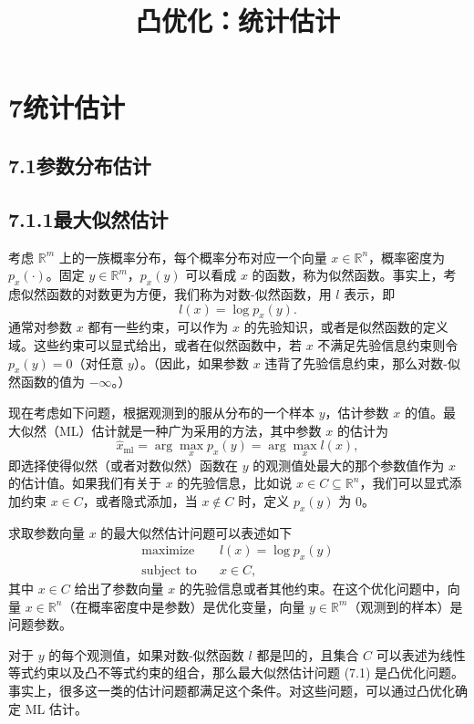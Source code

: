 \documentclass[UTF8, 12pt, fontset=fandol, oneside]{ctexart}
\title{凸优化：统计估计}
\author{}
\date{}
\begin{document}
\maketitle

\section*{7\quad 统计估计}

\subsection*{7.1\quad 参数分布估计}

\subsection*{7.1.1\quad 最大似然估计}

考虑 $\mathbb{R}^m$ 上的一族概率分布，每个概率分布对应一个向量 $x\in\mathbb{R}^n$，概率密度为 $p_x(\cdot)$。固定 $y\in\mathbb{R}^m$，$p_x(y)$ 可以看成 $x$ 的函数，称为似然函数。事实上，考虑似然函数的对数更为方便，我们称为对数-似然函数，用 $l$ 表示，即
\[
l(x)=\log p_x(y).
\]
通常对参数 $x$ 都有一些约束，可以作为 $x$ 的先验知识，或者是似然函数的定义域。这些约束可以显式给出，或者在似然函数中，若 $x$ 不满足先验信息约束则令 $p_x(y)=0$（对任意 $y$）。（因此，如果参数 $x$ 违背了先验信息约束，那么对数-似然函数的值为 $-\infty$。）

现在考虑如下问题，根据观测到的服从分布的一个样本 $y$，估计参数 $x$ 的值。最大似然（ML）估计就是一种广为采用的方法，其中参数 $x$ 的估计为
\[
\hat{x}_{\mathrm{ml}}=\arg\max_x p_x(y)=\arg\max_x l(x),
\]
即选择使得似然（或者对数似然）函数在 $y$ 的观测值处最大的那个参数值作为 $x$ 的估计值。如果我们有关于 $x$ 的先验信息，比如说 $x\in C\subseteq\mathbb{R}^n$，我们可以显式添加约束 $x\in C$，或者隐式添加，当 $x\notin C$ 时，定义 $p_x(y)$ 为 $0$。

求取参数向量 $x$ 的最大似然估计问题可以表述如下
\begin{equation}
\begin{aligned}
\text{maximize}\quad & l(x)=\log p_x(y)\\
\text{subject to}\quad & x\in C,
\end{aligned}
\tag{7.1}
\end{equation}
其中 $x\in C$ 给出了参数向量 $x$ 的先验信息或者其他约束。在这个优化问题中，向量 $x\in\mathbb{R}^n$（在概率密度中是参数）是优化变量，向量 $y\in\mathbb{R}^m$（观测到的样本）是问题参数。

对于 $y$ 的每个观测值，如果对数-似然函数 $l$ 都是凹的，且集合 $C$ 可以表述为线性等式约束以及凸不等式约束的组合，那么最大似然估计问题 (7.1) 是凸优化问题。事实上，很多这一类的估计问题都满足这个条件。对这些问题，可以通过凸优化确定 ML 估计。
\end{document}
